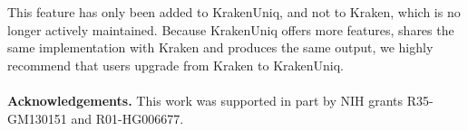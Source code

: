 \documentclass{article}
\begin{document}
This feature has only been added to KrakenUniq, and not to Kraken, which is no longer actively maintained. Because KrakenUniq offers more features, shares the same implementation with Kraken and produces the same output, we highly recommend that users upgrade from Kraken to KrakenUniq.
\\~\\
\textbf{Acknowledgements.}
This work was supported in part by NIH grants R35-GM130151 and R01-HG006677. 



\end{document}
